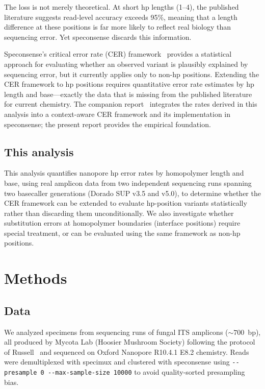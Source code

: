 \documentclass[11pt]{article}
\begin{document}
The loss is not merely theoretical. At short hp lengths (1--4), the published
literature suggests read-level accuracy exceeds 95\%, meaning that a length
difference at these positions is far more likely to reflect real biology than
sequencing error. Yet speconsense discards this information.

Speconsense's critical error rate (CER) framework~\cite{walker2026} provides a
statistical approach for evaluating whether an observed variant is plausibly
explained by sequencing error, but it currently applies only to non-hp
positions. Extending the CER framework to hp positions requires quantitative
error rate estimates by hp length and base---exactly the data that is missing
from the published literature for current chemistry. The companion
report~\cite{cer_practice} integrates the rates derived in this analysis into
a context-aware CER framework and its implementation in speconsense; the
present report provides the empirical foundation.

\subsection{This analysis}

This analysis quantifies nanopore hp error rates by homopolymer length and
base, using real amplicon data from two independent sequencing runs spanning
two basecaller generations (Dorado SUP v3.5 and v5.0), to determine whether
the CER framework can be extended to evaluate hp-position variants
statistically rather than discarding them unconditionally. We also investigate
whether substitution errors at homopolymer boundaries (interface positions)
require special treatment, or can be evaluated using the same framework as
non-hp positions.


\section{Methods}

\subsection{Data}

We analyzed specimens from sequencing runs of fungal ITS amplicons
(${\sim}700$~bp), all produced by Mycota Lab (Hoosier Mushroom Society)
following the protocol of Russell~\cite{russell2023} and sequenced on
Oxford Nanopore R10.4.1 E8.2 chemistry. Reads were demultiplexed with
specimux and clustered with speconsense using
\texttt{-{}-presample~0 -{}-max-sample-size~10000} to avoid quality-sorted
presampling bias.
\end{document}
